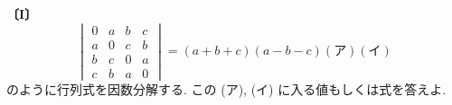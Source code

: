 \noindent\textbf{〔I〕}
\[
\begin{vmatrix}
0 & a & b & c\\
a & 0 & c & b\\
b & c & 0 & a\\
c & b & a & 0
\end{vmatrix}
=(a+b+c)(a-b-c)(\text{ア})(\text{イ})
\]
のように行列式を因数分解する. この (ア), (イ) に入る値もしくは式を答えよ.
